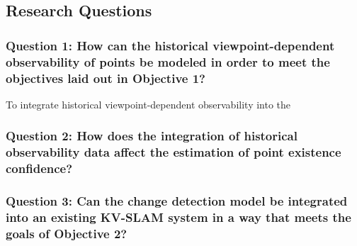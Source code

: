 \subsection{Research Questions}

\subsubsection*{Question 1: How can the historical viewpoint-dependent observability of points be modeled in order to meet the objectives laid out in Objective 1?}

To integrate historical viewpoint-dependent observability into the

\subsubsection*{Question 2: How does the integration of historical observability data affect the estimation of point existence confidence?}



\subsubsection*{Question 3: Can the change detection model be integrated into an existing KV-SLAM system in a way that meets the goals of Objective 2?}